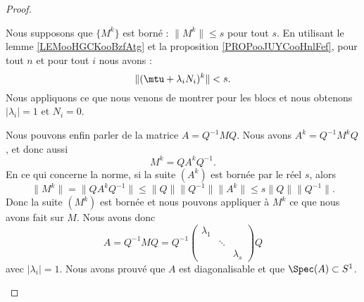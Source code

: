 \begin{proof}
\begin{subproof}
		Nous supposons que \( \{ M^k \}\) est borné : \( \| M^k \|\leq s\) pour tout \( s\). En utilisant le lemme \ref{LEMooHGCKooBzfAtg} et la proposition \ref{PROPooJUYCooHnlFef}, pour tout \( n\) et pour tout \( i\) nous avons :
		\begin{equation}
			\| (\mtu+\lambda_iN_i)^k \|<s.
		\end{equation}
		Nous appliquons ce que nous venons de montrer pour les blocs et nous obtenons \( | \lambda_i |=1\) et \( N_i=0\).

		\spitem[La matrice \( A\)]
		Nous pouvons enfin parler de la matrice \( A=Q^{-1}MQ\). Nous avons \( A^k=Q^{-1}M^kQ\), et donc aussi
		\begin{equation}
			M^k=QA^kQ^{-1}.
		\end{equation}
		En ce qui concerne la norme, si la suite \( (A^k)\) est bornée par le réel \( s\), alors
		\begin{equation}
			\| M^k \|=\| QA^kQ^{-1} \|\leq \| Q \|\| Q^{-1} \|\| A^k \|\leq s\| Q \|\| Q^{-1} \|.
		\end{equation}
		Donc la suite \( (M^k)\) est bornée et nous pouvons appliquer à \( M^k\) ce que nous avons fait sur \( M\). Nous avons donc
		\begin{equation}
			A=Q^{-1}MQ=Q^{-1}\begin{pmatrix}
				\lambda_1 &        &           \\
				          & \ddots &           \\
				          &        & \lambda_s
			\end{pmatrix}Q
		\end{equation}
		avec \( | \lambda_i |=1\). Nous avons prouvé que \( A\) est diagonalisable et que \( \Spec(A)\subset S^1\).
	\end{subproof}
\end{proof}
